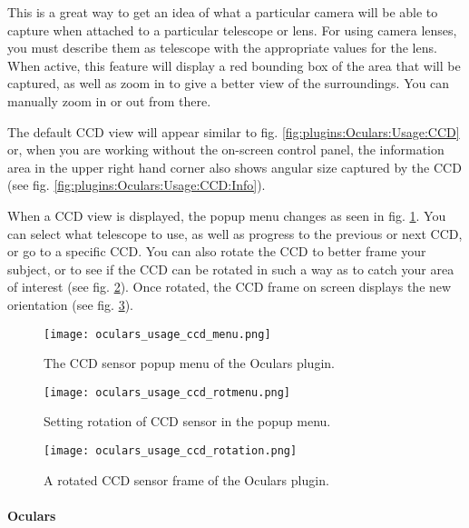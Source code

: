 \noindent This is a great way to get an idea of what a particular camera will be able to capture when attached to a particular telescope or lens. 
For using camera lenses, you must describe them as telescope with the appropriate values for the lens. 
When active, this feature will display a red bounding box of the area that will be captured, 
as well as zoom in to give a better view of the surroundings. You can manually zoom in or out from there.

The default CCD view will appear similar to fig. \ref{fig:plugins:Oculars:Usage:CCD} or, 
when you are working without the on-screen control panel, the information area in the upper right hand corner 
also shows angular size captured by the CCD (see fig. \ref{fig:plugins:Oculars:Usage:CCD:Info}).


When a CCD view is displayed, the popup menu changes  as seen in  fig. \ref{fig:plugins:Oculars:Usage:CCD:Menu}. 
You can select what telescope to use, as well as progress to the previous or next CCD, or go to a specific CCD. 
You can also rotate the CCD to better frame your subject, or to see if the CCD can be rotated in such a way as to 
catch your area of interest (see fig. \ref{fig:plugins:Oculars:Usage:CCD:RotMenu}). 
Once rotated, the CCD frame on screen displays the new orientation (see fig. \ref{fig:plugins:Oculars:Usage:CCD:Rotation}).

\begin{figure}[p]\centering
\texttt{[image: oculars\_usage\_ccd\_menu.png]}
\caption{The CCD sensor popup menu of the Oculars plugin.}
\label{fig:plugins:Oculars:Usage:CCD:Menu}
\end{figure}

\begin{figure}[p]\centering
\texttt{[image: oculars\_usage\_ccd\_rotmenu.png]}
\caption{Setting rotation of CCD sensor in the popup menu.}
\label{fig:plugins:Oculars:Usage:CCD:RotMenu}
\end{figure}

\begin{figure}[p]\centering
\texttt{[image: oculars\_usage\_ccd\_rotation.png]}
\caption{A rotated CCD sensor frame of the Oculars plugin.}
\label{fig:plugins:Oculars:Usage:CCD:Rotation}
\end{figure}

\newpage


\paragraph{Oculars}

